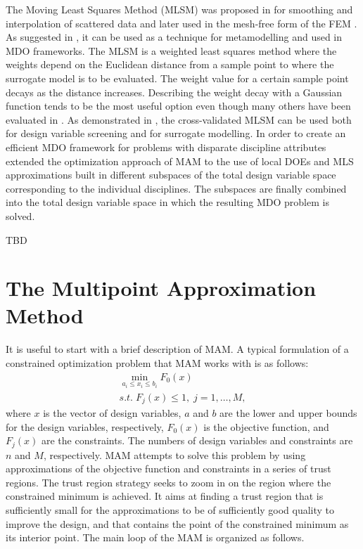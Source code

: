 \documentclass[runningheads,a4paper]{llncs}
\begin{document}
The Moving Least Squares Method (MLSM) was proposed in \cite{LancasterSalkauskas1981} for smoothing and interpolation of scattered data and later used in the mesh-free form of the FEM \cite{Liszka1984}. As suggested in \cite{ChoiYounYang2001}, it can be used as a technique for metamodelling and used in MDO frameworks. The MLSM is a weighted least squares method where the weights depend on the Euclidean distance from a sample point to where the surrogate model is to be evaluated. The weight value for a certain sample point decays as the distance increases. Describing the weight decay with a Gaussian function tends to be the most useful option even though many others have been evaluated in \cite{ToropovSchrammSahaiJones2005}. As demonstrated in \cite{PolynkinToropov2010}, the cross-validated MLSM can be used both for design variable screening and for surrogate modelling. In order to create an efficient MDO framework for problems with disparate discipline attributes \cite{OllarToropovJones2014} extended the optimization approach of MAM to the use of local DOEs and MLS approximations built in different subspaces of the total design variable space corresponding to the individual disciplines. The subspaces are finally combined into the total design variable space in which the resulting MDO problem is solved.

TBD

\section{The Multipoint Approximation Method}
\label{sec:MAM}

It is useful to start with a brief description of MAM. A typical formulation of a constrained optimization problem that MAM works with is as follows:
\begin{equation}
  \label{eq:problem}
  \begin{array}{c}
  \min\limits_{a_i \le x_i \le b_i}F_0(x) \\
  s.t.\; F_j(x) \le 1,\; j=1,\dots ,M,
  \end{array}
\end{equation}
where $x$ is the vector of design variables, $a$ and $b$ are the lower and upper bounds for the design variables, respectively, $F_0(x)$ is the objective function, and $F_j(x)$ are the constraints. The numbers of design variables and constraints are $n$ and $M$, respectively. MAM attempts to solve this problem by using approximations of the objective function and constraints in a series of trust regions. The trust region strategy seeks to zoom in on the region where the constrained minimum is achieved. It aims at finding a trust region that is sufficiently small for the approximations to be of sufficiently good quality to improve the design, and that contains the point of the constrained minimum as its interior point. The main loop of the MAM is organized as follows.
\end{document}
